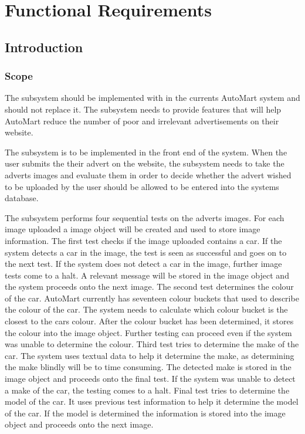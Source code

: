 \section{Functional Requirements}
\subsection{Introduction}

\subsubsection{Scope}
The subsystem should be implemented with in the currents AutoMart system and should not replace it. The subsystem needs to provide features that will help AutoMart reduce the number of poor and irrelevant advertisements on their website.

The subsystem is to be implemented in the front end of the system. When the user submits the their advert on the website, the subsystem needs to take the adverts images and evaluate them in order to decide whether the advert wished to be uploaded by the user should be allowed to be entered into the systems database.

The subsystem performs four sequential tests on the adverts images. For each image uploaded a image object will be created and used to store image information. The first test checks if the image uploaded contains a car. If the system detects a car in the image, the test is seen as successful and goes on to the next test. If the system does not detect a car in the image, further image tests come to a halt. A relevant message will be stored in the image object and the system proceeds onto the next image. The second test determines the colour of the car. AutoMart currently has seventeen colour buckets that used to describe the colour of the car. The system needs to calculate which colour bucket is the closest to the cars colour. After the colour bucket has been determined, it stores the colour  into the image object. Further testing can proceed even if the system was unable to determine the colour. Third test tries to determine the make of the car. The system uses textual data to help it determine the make, as determining the make blindly will be to time consuming. The detected make is stored in the image object and proceeds onto the final test. If the system was unable to detect a make of the car, the testing comes to a halt. Final test tries to determine the model of the car. It uses previous test information to help it determine the model of the car. If the model is determined the information is stored into the image object and proceeds onto the next image.

